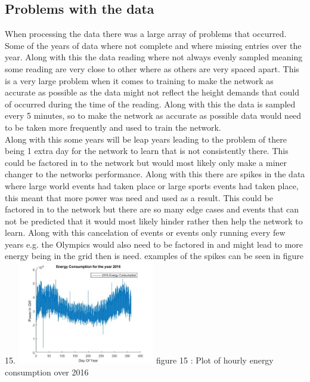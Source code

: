 \documentclass{IEEEtran}[11pt]
\begin{document}
\subsection{Problems with the data}
\begin{flushleft}
  When processing the data there was a large array of problems that occurred. Some of the years of data where not
  complete and where missing entries over the year. Along with this the data reading where not always evenly sampled
  meaning some reading are very close to other where as others are very spaced apart. This is a very large problem when
  it comes to training to make the network as accurate as possible as the data might not reflect the height demands that
  could of occurred during the time of the reading. Along with this the data is sampled every 5 minutes, so to make the
  network as accurate as possible data would need to be taken more frequently and used to train the network.
  \\
  \vspace{1.5mm}
  Along with this some years will be leap years leading to the problem of there being 1 extra day for the network to
  learn that is not consistently there. This could be factored in to the network but would most likely only make a miner
  changer to the networks performance. Along with this there are spikes in the data where large world events had taken
  place or large sports events had taken place, this meant that more power was need and used as a result.
  This could be factored in to the network but there are so many edge cases and events that can not be predicted that
  it would most likely hinder rather then help the network to learn. Along with this cancelation of events or events only
  running every few years e.g. the Olympics would also need to be factored in and might lead to more energy being in the
  grid then is need. examples of the spikes can be seen in figure 15.
  \vspace{1.5mm}
  \includegraphics[width = 0.45\textwidth]{2016datasetplotted}
  \vspace{1.5mm}
  {\footnotesize figure 15 : Plot of hourly energy consumption over 2016}
  \\
  \vspace{1.5mm}

\end{flushleft}
\end{document}
